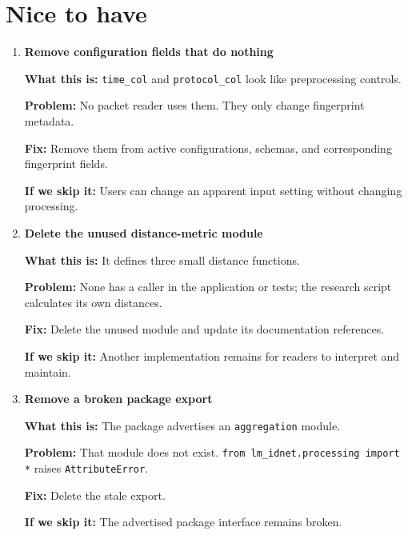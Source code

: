 \documentclass[11pt,a4paper]{article}
\begin{document}
\section*{Nice to have}

\begin{enumerate}[resume=findings]
\item \begin{minipage}[t]{\linewidth}
\textbf{Remove configuration fields that do nothing}


\textbf{What this is:} \texttt{time\_col} and \texttt{protocol\_col} look like
preprocessing controls.

\textbf{Problem:} No packet reader uses them. They only change fingerprint
metadata.

\textbf{Fix:} Remove them from active configurations, schemas, and corresponding
fingerprint fields.

\textbf{If we skip it:} Users can change an apparent input setting without
changing processing.
\end{minipage}

\item \begin{minipage}[t]{\linewidth}
\textbf{Delete the unused distance-metric module}


\textbf{What this is:} It defines three small distance functions.

\textbf{Problem:} None has a caller in the application or tests; the research
script calculates its own distances.

\textbf{Fix:} Delete the unused module and update its documentation references.

\textbf{If we skip it:} Another implementation remains for readers to interpret
and maintain.
\end{minipage}

\item \begin{minipage}[t]{\linewidth}
\textbf{Remove a broken package export}


\textbf{What this is:} The package advertises an \texttt{aggregation} module.

\textbf{Problem:} That module does not exist.
\texttt{from lm\_idnet.processing import *} raises \texttt{AttributeError}.

\textbf{Fix:} Delete the stale export.

\textbf{If we skip it:} The advertised package interface remains broken.
\end{minipage}

\end{enumerate}
\end{document}
